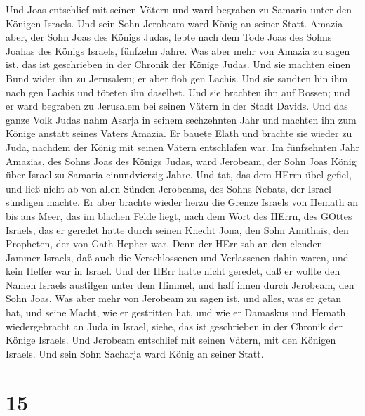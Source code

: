  Und Joas entschlief mit seinen Vätern und ward begraben zu
Samaria unter den Königen Israels. Und sein Sohn Jerobeam ward König an
seiner Statt.  Amazia aber, der Sohn Joas des Königs Judas,
lebte nach dem Tode Joas des Sohns Joahas des Königs Israels, fünfzehn
Jahre.  Was aber mehr von Amazia zu sagen ist, das ist
geschrieben in der Chronik der Könige Judas.  Und sie
machten einen Bund wider ihn zu Jerusalem; er aber floh gen Lachis. Und
sie sandten hin ihm nach gen Lachis und töteten ihn daselbst.
 Und sie brachten ihn auf Rossen; und er ward begraben zu
Jerusalem bei seinen Vätern in der Stadt Davids.  Und das
ganze Volk Judas nahm Asarja in seinem sechzehnten Jahr und machten ihn
zum Könige anstatt seines Vaters Amazia.  Er bauete Elath
und brachte sie wieder zu Juda, nachdem der König mit seinen Vätern
entschlafen war.  Im fünfzehnten Jahr Amazias, des Sohns
Joas des Königs Judas, ward Jerobeam, der Sohn Joas König über Israel zu
Samaria einundvierzig Jahre.  Und tat, das dem HErrn übel
gefiel, und ließ nicht ab von allen Sünden Jerobeams, des Sohns Nebats,
der Israel sündigen machte.  Er aber brachte wieder herzu
die Grenze Israels von Hemath an bis ans Meer, das im blachen Felde
liegt, nach dem Wort des HErrn, des GOttes Israels, das er geredet hatte
durch seinen Knecht Jona, den Sohn Amithais, den Propheten, der von
Gath-Hepher war.  Denn der HErr sah an den elenden Jammer
Israels, daß auch die Verschlossenen und Verlassenen dahin waren, und
kein Helfer war in Israel.  Und der HErr hatte nicht
geredet, daß er wollte den Namen Israels austilgen unter dem Himmel, und
half ihnen durch Jerobeam, den Sohn Joas.  Was aber mehr
von Jerobeam zu sagen ist, und alles, was er getan hat, und seine Macht,
wie er gestritten hat, und wie er Damaskus und Hemath wiedergebracht an
Juda in Israel, siehe, das ist geschrieben in der Chronik der Könige
Israels.  Und Jerobeam entschlief mit seinen Vätern, mit
den Königen Israels. Und sein Sohn Sacharja ward König an seiner Statt.

\hypertarget{section-14}{%
\section{15}\label{section-14}}

